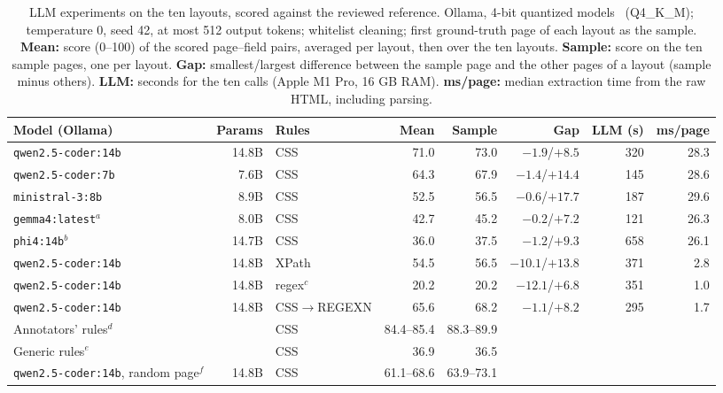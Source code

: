 \begin{table}[!htb]
  \centering
  \scriptsize
  \setlength{\tabcolsep}{3pt}
  \setlength{\abovetopsep}{3pt}
  \caption{LLM experiments on the ten layouts, scored against the reviewed reference. Ollama, 4-bit quantized models~\cite{hui2024qwen25coder,abdin2024phi4,liu2026ministral3,gemma2026gemma4} (Q4\_K\_M); temperature 0, seed 42, at most 512 output tokens; whitelist cleaning; first ground-truth page of each layout as the sample. \textbf{Mean:} score (0--100) of the scored page--field pairs, averaged per layout, then over the ten layouts. \textbf{Sample:} score on the ten sample pages, one per layout. \textbf{Gap:} smallest/largest difference between the sample page and the other pages of a layout (sample minus others). \textbf{LLM:} seconds for the ten calls (Apple M1 Pro, 16 GB RAM). \textbf{ms/page:} median extraction time from the raw HTML, including parsing.}
  \label{tab:llm}
  \begin{tabular}{@{}>{\raggedright\arraybackslash}p{2.75cm}rlrrrrr@{}}
    \toprule
    Model (Ollama) & Params & Rules & Mean & Sample & Gap & LLM (s) & ms/page \\
    \midrule
    \texttt{qwen2.5-coder:14b} & 14.8B & CSS & 71.0 & 73.0 & $-1.9$/$+8.5$ & 320 & 28.3 \\
    \texttt{qwen2.5-coder:7b} & 7.6B & CSS & 64.3 & 67.9 & $-1.4$/$+14.4$ & 145 & 28.6 \\
    \texttt{ministral-3:8b} & 8.9B & CSS & 52.5 & 56.5 & $-0.6$/$+17.7$ & 187 & 29.6 \\
    \texttt{gemma4:latest}$^{a}$ & 8.0B & CSS & 42.7 & 45.2 & $-0.2$/$+7.2$ & 121 & 26.3 \\
    \texttt{phi4:14b}$^{b}$ & 14.7B & CSS & 36.0 & 37.5 & $-1.2$/$+9.3$ & 658 & 26.1 \\
    \midrule
    \texttt{qwen2.5-coder:14b} & 14.8B & XPath & 54.5 & 56.5 & $-10.1$/$+13.8$ & 371 & 2.8 \\
    \texttt{qwen2.5-coder:14b} & 14.8B & regex$^{c}$ & 20.2 & 20.2 & $-12.1$/$+6.8$ & 351 & 1.0 \\
    \texttt{qwen2.5-coder:14b} & 14.8B & CSS$\rightarrow$REGEXN & 65.6 & 68.2 & $-1.1$/$+8.2$ & 295 & 1.7 \\
    \midrule
    Annotators' rules$^{d}$ & & CSS & 84.4--85.4 & 88.3--89.9 & & & \\
    Generic rules$^{e}$ & & CSS & 36.9 & 36.5 & & & \\
    \texttt{qwen2.5-coder:14b}, random page$^{f}$ & 14.8B & CSS & 61.1--68.6 & 63.9--73.1 & & & \\

\end{tabular}
\end{table}
